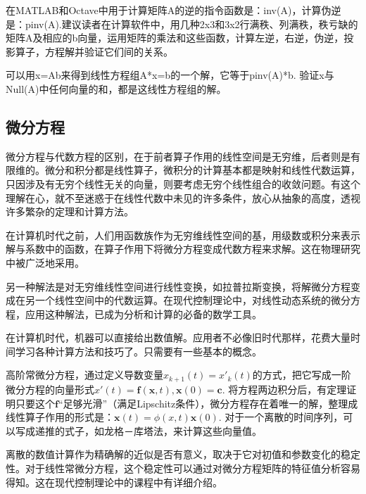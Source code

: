 在MATLAB和Octave中用于计算矩阵A的逆的指令函数是：inv(A)，计算伪逆是：pinv(A).建议读者在计算软件中，用几种2x3和3x2行满秩、列满秩，秩亏缺的矩阵A及相应的b向量，运用矩阵的乘法和这些函数，计算左逆，右逆，伪逆，投影算子，方程解并验证它们间的关系。

可以用x=Ab来得到线性方程组A*x=b的一个解，它等于pinv(A)*b. 验证x与Null(A)中任何向量的和，都是这线性方程组的解。

\songti

\subsection{微分方程}

微分方程与代数方程的区别，在于前者算子作用的线性空间是无穷维，后者则是有限维的。微分和积分都是线性算子，微积分的计算基本都是映射和线性代数运算，只因涉及有无穷个线性无关的向量，则要考虑无穷个线性组合的收敛问题。有这个理解在心，就不至迷惑于在线性代数中未见的许多条件，放心从抽象的高度，透视许多繁杂的定理和计算方法。

在计算机时代之前，人们用函数族作为无穷维线性空间的基，用级数或积分来表示解与系数中的函数，在算子作用下将微分方程变成代数方程来求解。这在物理研究中被广泛地采用。

另一种解法是对无穷维线性空间进行线性变换，如拉普拉斯变换，将解微分方程变成在另一个线性空间中的代数运算。在现代控制理论中，对线性动态系统的微分方程，应用这种解法，已成为分析和计算的必备的数学工具。

在计算机时代，机器可以直接给出数值解。应用者不必像旧时代那样，花费大量时间学习各种计算方法和技巧了。只需要有一些基本的概念。

高阶常微分方程，通过定义导数变量$ x_{k+1}(t)=x'_k(t) $的方式，把它写成一阶微分方程的向量形式$ x'(t) = \bm{f}(\bm{x}, t), \bm{x}(0) = \bm{c} $. 将方程两边积分后，有定理证明只要这个$ \bm{f} $“足够光滑”（满足Lipschitz条件），微分方程存在着唯一的解，整理成线性算子作用的形式是：$ \bm{x}(t) =\phi(x,t)\bm{x}(0) $. 对于一个离散的时间序列，可以写成递推的式子，如龙格－库塔法，来计算这些向量值。

离散的数值计算作为精确解的近似是否有意义，取决于它对初值和参数变化的稳定性。对于线性常微分方程，这个稳定性可以通过对微分方程矩阵的特征值分析容易得知。这在现代控制理论中的课程中有详细介绍。